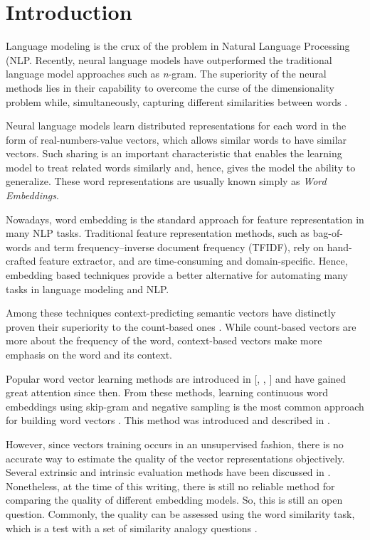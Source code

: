\documentclass[11pt,letterpaper]{article}
\begin{document}
\section{Introduction}\label{introduction}

Language modeling is the crux of the problem in Natural Language
Processing (NLP. Recently, neural language models have outperformed the
traditional language model approaches such as \emph{n}-gram. The
superiority of the neural methods lies in their capability to overcome
the curse of the dimensionality problem while, simultaneously, capturing
different similarities between words \citep{Goodfellow-et-al-2016}.

Neural language models learn distributed representations for each word
in the form of real-numbers-value vectors, which allows similar words to
have similar vectors. Such sharing is an important characteristic that
enables the learning model to treat related words similarly and, hence,
gives the model the ability to generalize. These word representations
are usually known simply as \emph{Word Embeddings}.

Nowadays, word embedding is the standard approach for feature
representation in many NLP tasks. Traditional feature representation
methods, such as bag-of-words and term frequency--inverse document
frequency (TFIDF), rely on hand-crafted feature extractor, and are
time-consuming and domain-specific. Hence, embedding based techniques
provide a better alternative for automating many tasks in language
modeling and NLP.

Among these techniques context-predicting semantic vectors have
distinctly proven their superiority to the count-based ones
\citep{baroni2014don}. While count-based vectors are more about the
frequency of the word, context-based vectors make more emphasis on the
word and its context.

Popular word vector learning methods are introduced in
{[}\citep{Mikolov:2013wc}, \citep{Pennington:2014uw},
\citep{Manning:2015kh}{]} and have gained great attention since then.
From these methods, learning continuous word embeddings using skip-gram
and negative sampling is the most common approach for building word
vectors \citep{ling2015two}. This method was introduced and described in
\citep{Mikolov:2013wc}.

However, since vectors training occurs in an unsupervised fashion, there
is no accurate way to estimate the quality of the vector representations
objectively. Several extrinsic and intrinsic evaluation methods have
been discussed in \citep{bakarov2018survey}. Nonetheless, at the time of
this writing, there is still no reliable method for comparing the
quality of different embedding models. So, this is still an open
question. Commonly, the quality can be assessed using the word
similarity task, which is a test with a set of similarity analogy
questions \citep{Mikolov:2013wc}.
\end{document}
